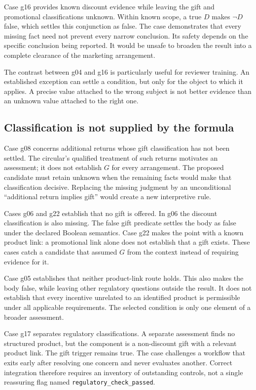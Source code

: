 Case g16 provides known discount evidence while leaving the gift and promotional
classifications unknown. Within known scope, a true $D$ makes $\neg D$ false,
which settles this conjunction as false. The case demonstrates that every
missing fact need not prevent every narrow conclusion. Its safety depends on
the specific conclusion being reported. It would be unsafe to broaden the
result into a complete clearance of the marketing arrangement.

The contrast between g04 and g16 is particularly useful for reviewer training.
An established exception can settle a condition, but only for the object to
which it applies. A precise value attached to the wrong subject is not better
evidence than an unknown value attached to the right one.

\subsection{Classification is not supplied by the formula}
Case g08 concerns additional returns whose gift classification has not been
settled. The circular's qualified treatment of such returns motivates an
assessment; it does not establish $G$ for every arrangement. The proposed
candidate must retain unknown when the remaining facts would make that
classification decisive. Replacing the missing judgment by an unconditional
``additional return implies gift'' would create a new interpretive rule.

Cases g06 and g22 establish that no gift is offered. In g06 the discount
classification is also missing. The false gift predicate settles the body as
false under the declared Boolean semantics. Case g22 makes the point with a
known product link: a promotional link alone does not establish that a gift
exists. These cases catch a candidate that assumed $G$ from the context instead
of requiring evidence for it.

Case g05 establishes that neither product-link route holds. This also makes the
body false, while leaving other regulatory questions outside the result. It
does not establish that every incentive unrelated to an identified product is
permissible under all applicable requirements. The selected condition is only
one element of a broader assessment.

Case g17 separates regulatory classifications. A separate assessment finds no
structured product, but the component is a non-discount gift with a relevant
product link. The gift trigger remains true. The case challenges a workflow
that exits early after resolving one concern and never evaluates another.
Correct integration therefore requires an inventory of outstanding controls,
not a single reassuring flag named \texttt{regulatory\_check\_passed}.

